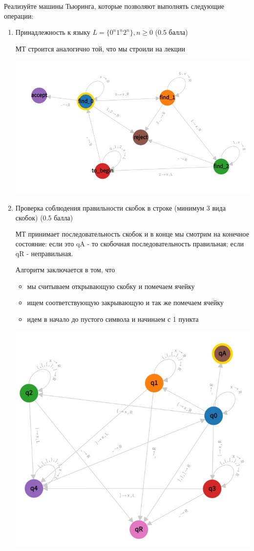 \documentclass[a4paper,12pt]{article}
\begin{document}
Реализуйте машины Тьюринга, которые позволяют выполнять следующие операции:
\begin{enumerate}
    \item Принадлежность к языку $L = \{ 0^n1^n2^n \}, n \ge 0$ (0.5 балла)
    
    МТ строится аналогично той, что мы строили на лекции
    
    \includegraphics[scale=0.5]{21hw3.jpg}
    
    \item Проверка соблюдения правильности скобок в строке (минимум 3 вида скобок) (0.5 балла)
    
     МТ принимает последовательность скобок и в конце мы смотрим на конечное состояние: если это qA - то скобочная последовательность правильная; если qR - неправильная.
     
     Алгоритм заключается в том, что 
        \begin{itemize}
            \item мы считываем открывающую скобку и помечаем ячейку
            \item ищем соответствующую закрывающую и так же помечаем ячейку
            \item идем в начало до пустого символа и начинаем с 1 пункта
        \end{itemize}
    
    \includegraphics[scale=0.5]{22hw3.jpg}
    

\end{enumerate}
\end{document}
